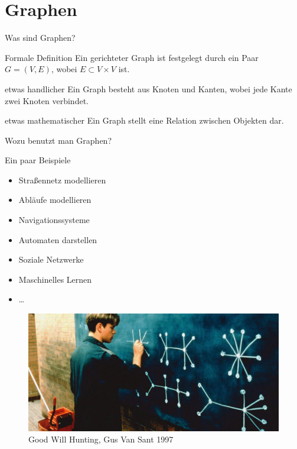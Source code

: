 \documentclass[18pt]{beamer}
\begin{document}
\section{Graphen}
    \begin{frame}{Was sind Graphen?}
        \begin{block}{Formale Definition}
            \glqq Ein gerichteter Graph ist festgelegt durch ein Paar $G = (V, E)$, wobei $E \subset V \times V$ ist\grqq \cite{worsch2016}.
        \end{block}
        \pause
        \begin{block}{etwas handlicher}
            Ein Graph besteht aus Knoten und Kanten, wobei jede Kante zwei Knoten verbindet.
        \end{block}
        \pause
        \begin{block}{etwas mathematischer}
            Ein Graph stellt eine Relation zwischen Objekten dar.
        \end{block}
    \end{frame}

    \begin{frame}[allowframebreaks]{Wozu benutzt man Graphen?}
        \begin{block}{Ein paar Beispiele}
            \begin{itemize}[<+->]
                \item Straßennetz modellieren
                \item Abläufe modellieren
                \item Navigationssysteme
                \item Automaten darstellen
                \item Soziale Netzwerke
                \item Maschinelles Lernen
                \item \dots
            \end{itemize}
        \end{block}
        \begin{figure}[]
            \centering
            \includegraphics[keepaspectratio,width=\textwidth]{logos/GoodWillHunting.jpg}
            \caption{Good Will Hunting, Gus Van Sant 1997}
        \end{figure}
    \end{frame}
\end{document}

